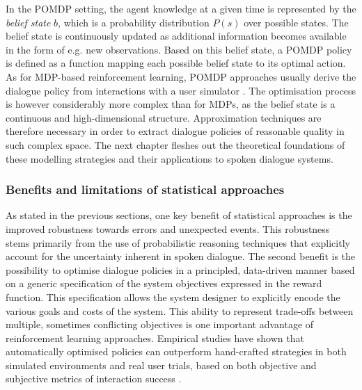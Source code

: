 In the POMDP setting, the agent knowledge at a given time is represented by the \textit{belief state} $b$, which is a probability distribution $P(s)$ over possible states.  The belief state is continuously updated as additional information becomes available in the form of e.g. new observations. Based on this belief state, a POMDP policy is defined as a function mapping each possible belief state to its optimal action.  As for MDP-based reinforcement learning, POMDP approaches usually derive the dialogue policy from interactions with a user simulator  \citep{Young:2010,Thomson:2010:BUD:1772996.1773040, daubigney2012}. The optimisation process is however considerably more complex than for MDPs, as the belief state is a continuous and high-dimensional structure. Approximation techniques are therefore necessary in order to extract dialogue policies of reasonable quality in such complex space. The next chapter fleshes out the theoretical foundations of these modelling strategies and their applications to spoken dialogue systems.

\subsubsection*{Benefits and limitations of statistical approaches}


As stated in the previous sections, one key benefit of statistical approaches is the improved robustness towards errors and unexpected events. This robustness stems primarily from the use of probabilistic reasoning techniques that explicitly account for the uncertainty inherent in spoken dialogue.  The second benefit is the possibility to optimise dialogue policies in a principled, data-driven manner based on a generic specification of the system objectives expressed in the reward function.  This specification allows the system designer to explicitly encode the various goals and costs of the system. This ability to represent trade-offs between multiple, sometimes conflicting objectives is one important advantage of reinforcement learning approaches.  Empirical studies have shown that automatically optimised policies can outperform hand-crafted strategies in both simulated environments and  real user trials, based on both objective and subjective metrics of interaction success \citep{Supelec270,6407655}. 

